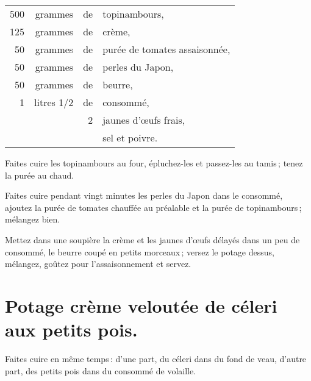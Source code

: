 \footnotesize
\begin{longtable}{rrrp{16em}}                                                    
    500 & grammes    & de & topinambours,                                                                 \\
    125 & grammes    & de & crème,                                                                        \\
     50 & grammes    & de & purée de tomates assaisonnée,                                                 \\
     50 & grammes    & de & perles du Japon,                                                              \\
     50 & grammes    & de & beurre,                                                                       \\
      1 & litres 1/2 & de & consommé,                                                                     \\
        &            &  2 & jaunes d'œufs frais,                                                          \\
        &            &    & sel et poivre.                                                                \\
\end{longtable}
\normalsize

Faites cuire les topinambours au four, épluchez-les et passez-les au tamis ;
tenez la purée au chaud.

Faites cuire pendant vingt minutes les perles du Japon dans le consommé,
ajoutez la purée de tomates chauffée au préalable et la purée de topinambours ;
mélangez bien.

Mettez dans une soupière la crème et les jaunes d'œufs délayés dans un peu de
consommé, le beurre coupé en petits morceaux ; versez le potage dessus, mélangez,
goûtez pour l'assaisonnement et servez.

\section*{\centering Potage crème veloutée de céleri aux petits pois.}

Faites cuire en même temps : d’une part, du céleri dans du fond de veau,
d'autre part, des petits pois dans du consommé de volaille.

